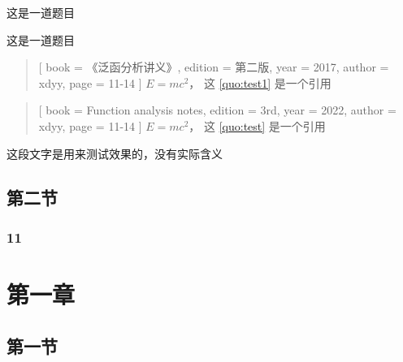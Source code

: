 \documentclass{xdyy-notes}
\begin{document}
\begin{exercise}
  这是一道题目
\end{exercise}

\begin{exercise}
  这是一道题目
\end{exercise}


\begin{quotation}[
  book    = {《泛函分析讲义》},      %
  edition = {第二版},                %
  year    = {2017},                  %
  author  = {xdyy},                  %
  page    = {11-14}                  %
]\label{quo:test1}
  $E = m c^2$， 这 \ref{quo:test1} 是一个引用
\end{quotation}


\begin{quotation}[
  book = {Function analysis notes},
  edition = {3rd},
  year = {2022},
  author = {xdyy},
  page = {11-14}
]\label{quo:test}
  $E = m c^2$， 这 \ref{quo:test} 是一个引用
\end{quotation}


\begin{detail}[
  book = {《泛函分析讲义》},
  author = {许全华},
  edition = {第一版},
  year = {2017},
  page = {103},
  line = {倒数第三行},
  original = {
    \zhlipsum[1-2]
  }
]
  这段文字是用来测试效果的，没有实际含义
\end{detail}





\correction[
  book = {《摸鱼讲义》},
  author = {夏康玮},
  edition = {第一版},
  year = {2022},
  page = {88},
  line = {3},
  original = {
    \zhlipsum[1]
  },
  revision = {
    \zhlipsum[2]
  },
  explanation = {
    无须多言
  }
]

\section{第二节}


\zhlipsum[1-6]






\subsection{11}


\zhlipsum[1-2]



\chapter{第一章}

\section{第一节}
\cite{DiophantineQueffelec}


\backmatter
\printbibliography
\end{document}
